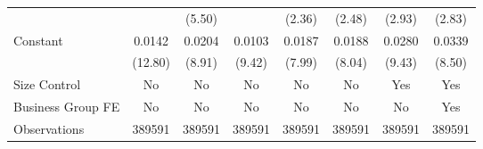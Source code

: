 {\begin{tabular}{l*{7}{c}}
                &                  &   (5.50)         &                  &   (2.36)         &   (2.48)         &   (2.93)         &   (2.83)         \\
[1em]
Constant        &   0.0142\sym{***}&   0.0204\sym{***}&   0.0103\sym{***}&   0.0187\sym{***}&   0.0188\sym{***}&   0.0280\sym{***}&   0.0339\sym{***}\\
                &  (12.80)         &   (8.91)         &   (9.42)         &   (7.99)         &   (8.04)         &   (9.43)         &   (8.50)         \\
\hline
Size Control    &       No         &       No         &       No         &       No         &       No         &      Yes         &      Yes         \\
Business Group FE&       No         &       No         &       No         &       No         &       No         &       No         &      Yes         \\
Observations    &   389591         &   389591         &   389591         &   389591         &   389591         &   389591         &   389591         \\
\hline\hline  \end{tabular}}
